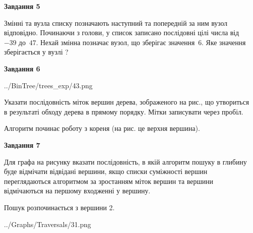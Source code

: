 \documentclass[12pt, ukrainian]{article}
\begin{document}
{\begin {large}
{\begin {center}\textbf{Завдання 5}\end {center}}\par
Змінні  та  вузла списку позначають наступний та попередній за ним вузол відповідно. Починаючи з голови, у список записано послідовні цілі числа від~$-39$ до~$47$. Нехай змінна  позначає вузол, що зберігає значення~$6$.
Яке значення зберігається у вузлі  ?\par
\newpage

{\begin {center}\textbf{Завдання 6}\end {center}}\par

\begin{center}
	{../BinTree/trees_exp/43.png}
\end{center}
Указати послідовність міток вершин дерева, зображеного на рис., що утвориться в результаті обходу дерева в прямому порядку. Мітки записувати через пробіл.\par Алгоритм починає роботу з кореня (на рис. це верхня вершина).\par
\newpage

{\begin {center}\textbf{Завдання 7}\end {center}}\par
Для графа на рисунку вказати послідовність, в якій алгоритм пошуку в глибину буде відмічати відвідані вершини, якщо списки суміжності вершин переглядаються алгоритмом за зростанням міток вершин та вершини відмічаються на першому вход\-женні у вершину.\par
Пошук розпочинається з вершини 2.\par

\begin{center}
	{../Graphs/Traversals/31.png}
\end{center}\par
\newpage


\end{large}}
\end{document}
